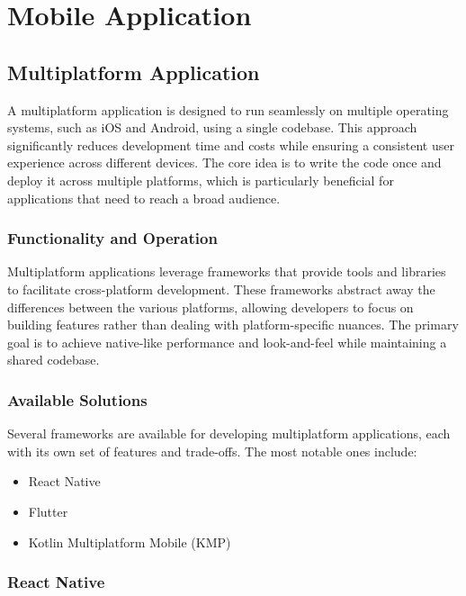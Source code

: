 \section{Mobile Application}\label{sec:mobile-application}

\subsection{Multiplatform Application}\label{sec:multiplatform-application}

A multiplatform application is designed to run seamlessly on multiple operating systems, such as iOS and Android, using a single codebase. This approach significantly reduces development time and costs while ensuring a consistent user experience across different devices. The core idea is to write the code once and deploy it across multiple platforms, which is particularly beneficial for applications that need to reach a broad audience.

\subsubsection{Functionality and Operation}

Multiplatform applications leverage frameworks that provide tools and libraries to facilitate cross-platform development. These frameworks abstract away the differences between the various platforms, allowing developers to focus on building features rather than dealing with platform-specific nuances. The primary goal is to achieve native-like performance and look-and-feel while maintaining a shared codebase.

\subsubsection{Available Solutions}

Several frameworks are available for developing multiplatform applications, each with its own set of features and trade-offs. The most notable ones include:

\begin{itemize}
    \item React Native\cite{ReactNativeBook}
    \item Flutter\cite{Flutter}
    \item Kotlin Multiplatform Mobile (KMP)\cite{KMP}
\end{itemize}

\subsubsection{React Native}


